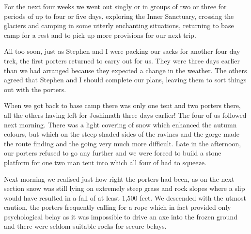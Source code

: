 \documentclass[a5paper,openany,font 10pt]{scrbook}
\begin{document}
For the next four weeks we went out singly or in groups of
two or three for periods of up to  four or five days, exploring
the Inner Sanctuary, crossing the glaciers and camping in some
utterly enchanting situations, returning to base camp for a rest
and to pick up more provisions for our next trip.

All too soon, just as Stephen and I were packing our sacks
for another four day trek, the first porters returned to carry
out for us. They were three days earlier than we had arranged
because they expected a change in the weather. The others agreed
that Stephen and I should complete our plans, leaving them to
sort things out with the porters.

When we got back to base camp there was only one tent and
two porters there, all the others having left for Joshimath three
days earlier! The four of us followed next morning. There was a
light covering of snow which enhanced the autumn colours, but
which on the steep shaded sides of the ravines and the gorge made
the route finding and the going very much more difficult. Late in
the afternoon, our porters refused to go any further and we were
forced to build a stone platform for one two man tent into which
all four of had to squeeze.

Next morning we realised just how right the porters had
been, as on the next section snow was still lying on extremely
steep grass and rock slopes where a slip would have resulted in a
fall of at least 1,500 feet. We descended with the utmost
caution, the porters frequently calling for a rope which in fact
provided only  psychological belay as it was impossible to drive
an axe into the frozen ground and there were seldom suitable
rocks for secure belays.
\end{document}
